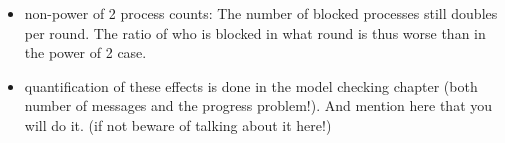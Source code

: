 \documentclass[a4paper, 10pt]{article}
\begin{document}
\begin{enumerate}
\begin{itemize}
\begin{itemize}
%
%
%
%
%
%
			\item non-power of 2 process counts: The number of blocked processes still doubles per round. The ratio of who is blocked in what round is thus worse than in the power of 2 case.
			\item quantification of these effects is done in the model checking chapter (both number of messages and the progress problem!). And mention here that you will do it. (if not beware of talking about it here!)
		\end{itemize}
\end{itemize}


\end{enumerate}
\end{document}
